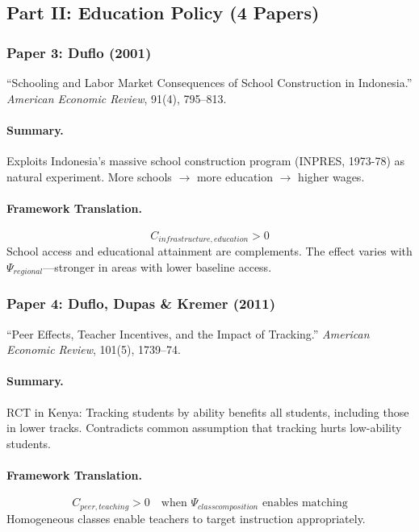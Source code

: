 \subsection{Part II: Education Policy (4 Papers)}

\subsubsection{Paper 3: Duflo (2001)}

``Schooling and Labor Market Consequences of School Construction in Indonesia.''
\textit{American Economic Review}, 91(4), 795--813.

\paragraph{Summary.}
Exploits Indonesia's massive school construction program (INPRES, 1973-78) as
natural experiment. More schools $\rightarrow$ more education $\rightarrow$ higher wages.

\paragraph{Framework Translation.}
\begin{equation}
  C_{infrastructure, education} > 0
\end{equation}
School access and educational attainment are complements. The effect varies with
$\Psi_{regional}$---stronger in areas with lower baseline access.

\subsubsection{Paper 4: Duflo, Dupas \& Kremer (2011)}

``Peer Effects, Teacher Incentives, and the Impact of Tracking.''
\textit{American Economic Review}, 101(5), 1739--74.

\paragraph{Summary.}
RCT in Kenya: Tracking students by ability benefits all students, including those
in lower tracks. Contradicts common assumption that tracking hurts low-ability students.

\paragraph{Framework Translation.}
\begin{equation}
  C_{peer, teaching} > 0 \quad \text{when } \Psi_{class composition} \text{ enables matching}
\end{equation}
Homogeneous classes enable teachers to target instruction appropriately.

